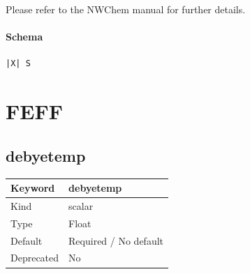 \documentclass[11pt]{article}
\begin{document}
 Please refer to the NWChem manual for further details.

\paragraph{Schema}
\begin{Verbatim}
|X| S
\end{Verbatim}

\section{FEFF}

\subsection{debyetemp}
\label{kw:debyetemp}
\begin{longtable}{|p{1.5in}|p{4.5in}|}
\hline
Keyword & debyetemp \\
\hline
Kind & scalar \\
\hline
Type & Float \\
\hline
Default & Required / No default \\
\hline
Deprecated & No \\
\hline
\end{longtable}
\end{document}
